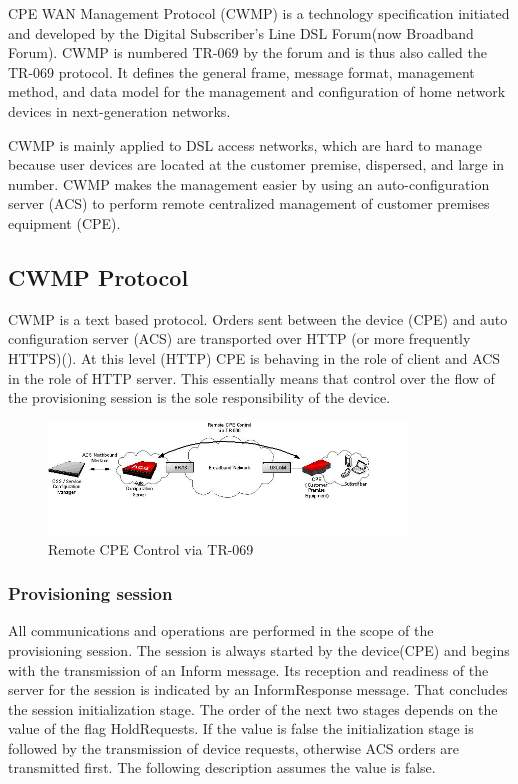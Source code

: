 CPE WAN Management Protocol (CWMP) is a technology specification initiated and developed by the Digital Subscriber’s Line DSL Forum(now Broadband Forum). CWMP is numbered TR-069 by the forum and is thus also called the TR-069 protocol. It defines the general frame, message format, management method, and data model for the management and configuration of home network devices in next-generation networks.

CWMP is mainly applied to DSL access networks, which are hard to manage because user devices are located at the customer premise, dispersed, and large in number. CWMP makes the management easier by using an auto-configuration server (ACS) to perform remote centralized management of customer premises equipment (CPE).



\subsection{CWMP Protocol}
\label{basics}
CWMP is a text based protocol. Orders sent between the device (CPE) and auto configuration server (ACS) are transported over HTTP (or more frequently HTTPS)(). At this level (HTTP) CPE is behaving in the role of client and ACS in the role of HTTP server. This essentially means that control over the flow of the provisioning session is the sole responsibility of the device.
\begin{figure}[htbp]
	\centering
		\includegraphics[width=9.5cm]{Figures/Remote_CPE_Control_via_TR-069.jpg}
	\caption[Remote CPE Control via TR-069]{Remote CPE Control via TR-069}
	\label{fig:remotecontrol}
\end{figure}
\subsubsection{Provisioning session}
All communications and operations are performed in the scope of the provisioning session. The session is always started by the device(CPE) and begins with the transmission of an Inform message. Its reception and readiness of the server for the session is indicated by an InformResponse message. That concludes the session initialization stage. The order of the next two stages depends on the value of the flag HoldRequests. If the value is false the initialization stage is followed by the transmission of device requests, otherwise ACS orders are transmitted first. The following description assumes the value is false.

